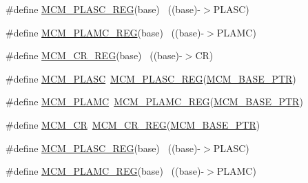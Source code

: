\begin{DoxyCompactItemize}
\item 
\#define \hyperlink{group___m_c_m___register___accessor___macros_gad331cc7eeaf62bb3d0fc388993df2a8f}{M\+C\+M\+\_\+\+P\+L\+A\+S\+C\+\_\+\+R\+EG}(base)                                        ~((base)-\/$>$P\+L\+A\+SC)
\item 
\#define \hyperlink{group___m_c_m___register___accessor___macros_ga56804c4b9f516c18d994d033cae1dc30}{M\+C\+M\+\_\+\+P\+L\+A\+M\+C\+\_\+\+R\+EG}(base)                                        ~((base)-\/$>$P\+L\+A\+MC)
\item 
\#define \hyperlink{group___m_c_m___register___accessor___macros_ga87cff4614e51fe78514025afa607e87c}{M\+C\+M\+\_\+\+C\+R\+\_\+\+R\+EG}(base)                                              ~((base)-\/$>$CR)
\item 
\#define \hyperlink{group___m_c_m___register___accessor___macros_ga1741cb7cdef46052c2ac9e7d28fb2b53}{M\+C\+M\+\_\+\+P\+L\+A\+SC}~\hyperlink{group___m_c_m___register___accessor___macros_gad331cc7eeaf62bb3d0fc388993df2a8f}{M\+C\+M\+\_\+\+P\+L\+A\+S\+C\+\_\+\+R\+EG}(\hyperlink{group___m_c_m___peripheral_gad41e931f176c230831e3dbad45117841}{M\+C\+M\+\_\+\+B\+A\+S\+E\+\_\+\+P\+TR})
\item 
\#define \hyperlink{group___m_c_m___register___accessor___macros_ga63f36c9c5700eb5fca4fe3852e1d6dfd}{M\+C\+M\+\_\+\+P\+L\+A\+MC}~\hyperlink{group___m_c_m___register___accessor___macros_ga56804c4b9f516c18d994d033cae1dc30}{M\+C\+M\+\_\+\+P\+L\+A\+M\+C\+\_\+\+R\+EG}(\hyperlink{group___m_c_m___peripheral_gad41e931f176c230831e3dbad45117841}{M\+C\+M\+\_\+\+B\+A\+S\+E\+\_\+\+P\+TR})
\item 
\#define \hyperlink{group___m_c_m___register___accessor___macros_ga36dc3a2bb3893931d3c37cbe03661635}{M\+C\+M\+\_\+\+CR}~\hyperlink{group___m_c_m___register___accessor___macros_ga87cff4614e51fe78514025afa607e87c}{M\+C\+M\+\_\+\+C\+R\+\_\+\+R\+EG}(\hyperlink{group___m_c_m___peripheral_gad41e931f176c230831e3dbad45117841}{M\+C\+M\+\_\+\+B\+A\+S\+E\+\_\+\+P\+TR})
\item 
\#define \hyperlink{group___m_c_m___register___accessor___macros_gad331cc7eeaf62bb3d0fc388993df2a8f}{M\+C\+M\+\_\+\+P\+L\+A\+S\+C\+\_\+\+R\+EG}(base)                                        ~((base)-\/$>$P\+L\+A\+SC)
\item 
\#define \hyperlink{group___m_c_m___register___accessor___macros_ga56804c4b9f516c18d994d033cae1dc30}{M\+C\+M\+\_\+\+P\+L\+A\+M\+C\+\_\+\+R\+EG}(base)                                        ~((base)-\/$>$P\+L\+A\+MC)
\item 

\end{DoxyCompactItemize}
